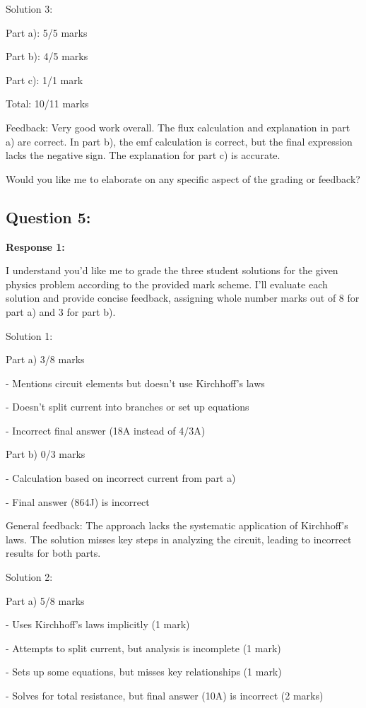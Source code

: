\documentclass[a4paper,11pt]{article}
\begin{document}
Solution 3:

Part a): 5/5 marks

Part b): 4/5 marks

Part c): 1/1 mark

Total: 10/11 marks

Feedback: Very good work overall. The flux calculation and explanation in part a) are correct. In part b), the emf calculation is correct, but the final expression lacks the negative sign. The explanation for part c) is accurate.

Would you like me to elaborate on any specific aspect of the grading or feedback?

\subsection*{Question 5:}

\textbf{Response 1:}

I understand you'd like me to grade the three student solutions for the given physics problem according to the provided mark scheme. I'll evaluate each solution and provide concise feedback, assigning whole number marks out of 8 for part a) and 3 for part b).

Solution 1:

Part a) 3/8 marks

- Mentions circuit elements but doesn't use Kirchhoff's laws

- Doesn't split current into branches or set up equations

- Incorrect final answer (18A instead of 4/3A)

Part b) 0/3 marks

- Calculation based on incorrect current from part a)

- Final answer (864J) is incorrect

General feedback: The approach lacks the systematic application of Kirchhoff's laws. The solution misses key steps in analyzing the circuit, leading to incorrect results for both parts.

Solution 2:

Part a) 5/8 marks

- Uses Kirchhoff's laws implicitly (1 mark)

- Attempts to split current, but analysis is incomplete (1 mark)

- Sets up some equations, but misses key relationships (1 mark)

- Solves for total resistance, but final answer (10A) is incorrect (2 marks)
\end{document}
